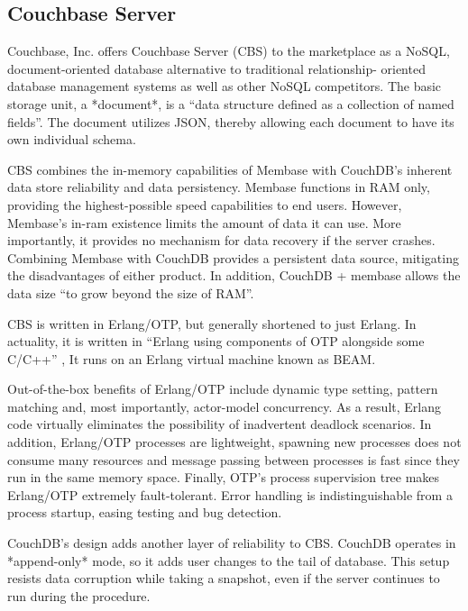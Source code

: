 \subsection{ Couchbase Server}

     Couchbase, Inc. offers Couchbase Server (CBS) to the marketplace
     as a NoSQL, document-oriented database alternative to traditional
     relationship- oriented database management systems as well as
     other NoSQL competitors.  The basic storage unit, a *document*,
     is a ``data structure defined as a collection of named fields''.
     The document utilizes JSON, thereby allowing each document to
     have its own individual schema. \cite{www-infoworld-cbs}

     CBS combines the in-memory capabilities of Membase with CouchDB's
     inherent data store reliability and data persistency.  Membase
     functions in RAM only, providing the highest-possible speed
     capabilities to end users.  However, Membase's in-ram existence
     limits the amount of data it can use.  More importantly, it
     provides no mechanism for data recovery if the server crashes.
     Combining Membase with CouchDB provides a persistent data source,
     mitigating the disadvantages of either product.  In addition,
     CouchDB + membase allows the data size ``to grow beyond the size
     of RAM''.  \cite{www-safaribooks-cbs}

     CBS is written in Erlang/OTP, but generally shortened to just
     Erlang.  In actuality, it is written in ``Erlang using components
     of OTP alongside some C/C++'' \cite{www-erlangcentral-cbs}, It
     runs on an Erlang virtual machine known as
     BEAM. \cite{www-wikipedia-erlang-cbs}

     Out-of-the-box benefits of Erlang/OTP include dynamic type
     setting, pattern matching and, most importantly, actor-model
     concurrency.  As a result, Erlang code virtually eliminates the
     possibility of inadvertent deadlock scenarios.  In addition,
     Erlang/OTP processes are lightweight, spawning new processes does
     not consume many resources and message passing between processes
     is fast since they run in the same memory space.  Finally, OTP's
     process supervision tree makes Erlang/OTP extremely
     fault-tolerant.  Error handling is indistinguishable from a
     process startup, easing testing and bug detection.
     \cite{www-couchbase-blog-cbs}

     CouchDB's design adds another layer of reliability to CBS.
     CouchDB operates in *append-only* mode, so it adds user changes
     to the tail of database.  This setup resists data corruption
     while taking a snapshot, even if the server continues to run
     during the procedure.  \cite{www-hightower-cbs}

